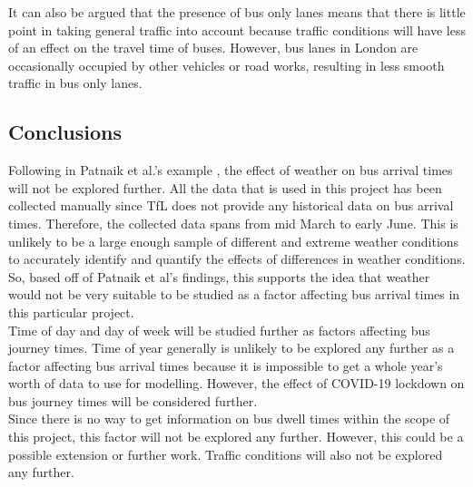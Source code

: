 It can also be argued that the presence of bus only lanes means that there is little point in taking general traffic into account because traffic conditions will have less of an effect on the travel time of buses. However, bus lanes in London are occasionally occupied by other vehicles or road works, resulting in less smooth traffic in bus only lanes.

\subsection{Conclusions}

Following in Patnaik et al.'s example \cite{apc-estimation}, the effect of weather on bus arrival times will not be explored further. All the data that is used in this project has been collected manually since TfL does not provide any historical data on bus arrival times. Therefore, the collected data spans from mid March to early June. This is unlikely to be a large enough sample of different and extreme weather conditions to accurately identify and quantify the effects of differences in weather conditions. So, based off of Patnaik et al's findings, this supports the idea that weather would not be very suitable to be studied as a factor affecting bus arrival times in this particular project. \\

Time of day and day of week will be studied further as factors affecting bus journey times. Time of year generally is unlikely to be explored any further as a factor affecting bus arrival times because it is impossible to get a whole year's worth of data to use for modelling. However, the effect of COVID-19 lockdown on bus journey times will be considered further. \\

Since there is no way to get information on bus dwell times within the scope of this project, this factor will not be explored any further. However, this could be a possible extension or further work. Traffic conditions will also not be explored any further. \\

\clearpage